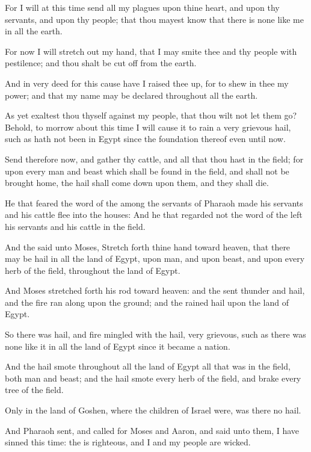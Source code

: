 \Verse For I will at this time send all my plagues upon thine heart, and upon thy servants, and upon thy people; that thou mayest know that there is none like me in all the earth.

\Verse For now I will stretch out my hand, that I may smite thee and thy people with pestilence; and thou shalt be cut off from the earth.

\Verse And in very deed for this cause have I raised thee up, for to shew in thee my power; and that my name may be declared throughout all the earth.

\Verse As yet exaltest thou thyself against my people, that thou wilt not let them go?  \Verse Behold, to morrow about this time I will cause it to rain a very grievous hail, such as hath not been in Egypt since the foundation thereof even until now.

\Verse Send therefore now, and gather thy cattle, and all that thou hast in the field; for upon every man and beast which shall be found in the field, and shall not be brought home, the hail shall come down upon them, and they shall die.

\Verse He that feared the word of the \LORD among the servants of Pharaoh made his servants and his cattle flee into the houses: \Verse And he that regarded not the word of the \LORD left his servants and his cattle in the field.

\Verse And the \LORD said unto Moses, Stretch forth thine hand toward heaven, that there may be hail in all the land of Egypt, upon man, and upon beast, and upon every herb of the field, throughout the land of Egypt.

\Verse And Moses stretched forth his rod toward heaven: and the \LORD sent thunder and hail, and the fire ran along upon the ground; and the \LORD rained hail upon the land of Egypt.

\Verse So there was hail, and fire mingled with the hail, very grievous, such as there was none like it in all the land of Egypt since it became a nation.

\Verse And the hail smote throughout all the land of Egypt all that was in the field, both man and beast; and the hail smote every herb of the field, and brake every tree of the field.

\Verse Only in the land of Goshen, where the children of Israel were, was there no hail.

\Verse And Pharaoh sent, and called for Moses and Aaron, and said unto them, I have sinned this time: the \LORD is righteous, and I and my people are wicked.

